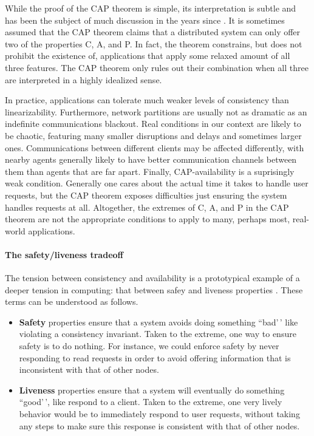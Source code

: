 \documentclass[]             %
{NASA}                       %
\theoremstyle{definition}
\begin{document}
While the proof of the CAP theorem is simple, its interpretation is
subtle and has been the subject of much discussion in the years since
\cite{2012CAP12Years}. It is sometimes assumed that the CAP theorem claims that
a distributed system can only offer two of the properties C, A, and P.
In fact, the theorem constrains, but does not prohibit the existence of,
applications that apply some relaxed amount of all three features. The
CAP theorem only rules out their combination when all three are
interpreted in a highly idealized sense.

In practice, applications can tolerate much weaker levels of consistency
than linearizability. Furthermore, network partitions are usually not as
dramatic as an indefinite communications blackout. Real conditions in
our context are likely to be chaotic, featuring many smaller disruptions
and delays and sometimes larger ones. Communications between different
clients may be affected differently, with nearby agents generally likely
to have better communication channels between them than agents that are
far apart. Finally, CAP-availability is a suprisingly weak condition.
Generally one cares about the actual time it takes to handle user
requests, but the CAP theorem exposes difficulties just ensuring the
system handles requests at all. Altogether, the extremes of C, A, and P
in the CAP theorem are not the appropriate conditions to apply to many,
perhaps most, real-world applications.

\paragraph{The safety/liveness tradeoff}

The tension between consistency and availability is a prototypical
example of a deeper tension in computing: that between safey and
liveness properties \cite{10.1145/5505.5508 2012perspectivesCAP}. These terms can be understood as follows.

\begin{itemize}
\item
  \textbf{Safety} properties ensure that a system avoids doing something
  ``bad'\,' like violating a consistency invariant. Taken to the
  extreme, one way to ensure safety is to do nothing. For instance, we
  could enforce safety by never responding to read requests in order to
  avoid offering information that is inconsistent with that of other
  nodes.
\item
  \textbf{Liveness} properties ensure that a system will eventually do
  something ``good'\,', like respond to a client. Taken to the extreme,
  one very lively behavior would be to immediately respond to user
  requests, without taking any steps to make sure this response is
  consistent with that of other nodes.
\end{itemize}
\end{document}
